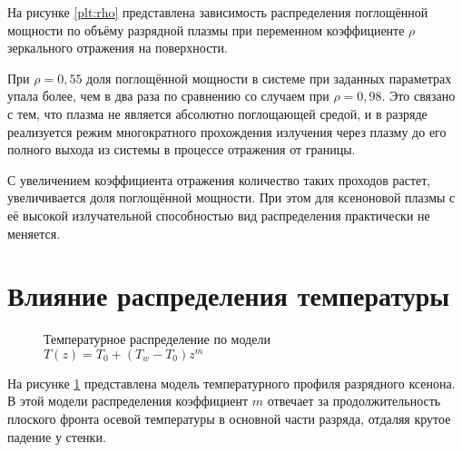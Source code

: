 На рисунке \ref{plt:rho} представлена зависимость распределения поглощённой мощности по объёму разрядной плазмы при переменном коэффициенте $\rho$ зеркального отражения на поверхности.

При $\rho = 0,55$ доля поглощённой мощности в системе при заданных параметрах упала более, чем в два раза по сравнению со случаем при $\rho = 0,98$.
Это связано с тем, что плазма не является абсолютно поглощающей средой, и в разряде реализуется режим многократного прохождения излучения через плазму до его полного выхода из системы в процессе отражения от границы.

С увеличением коэффициента отражения количество таких проходов растет, увеличивается доля поглощённой мощности.
При этом для ксеноновой плазмы с её высокой излучательной способностью вид распределения практически не меняется.

\section{Влияние распределения температуры}

\begin{figure}[H]
	\noindent{}
	\captionsetup{justification=centering}
	\caption{Температурное распределение по модели $T(z) = T_0 + (T_w - T_0)z^m$}
	\label{plt:temperature}
\end{figure}

На рисунке \ref{plt:temperature} представлена модель температурного профиля разрядного ксенона. В этой модели распределения коэффициент $m$ отвечает за продолжительность плоского фронта осевой температуры в основной части разряда, отдаляя крутое падение у стенки.

